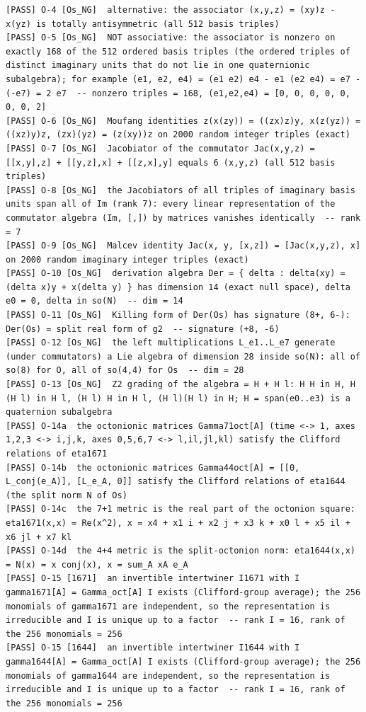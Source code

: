 \documentclass[
  10pt,
]{article}
\begin{document}
\begin{verbatim}
[PASS] O-4 [Os_NG]  alternative: the associator (x,y,z) = (xy)z - x(yz) is totally antisymmetric (all 512 basis triples)
[PASS] O-5 [Os_NG]  NOT associative: the associator is nonzero on exactly 168 of the 512 ordered basis triples (the ordered triples of distinct imaginary units that do not lie in one quaternionic subalgebra); for example (e1, e2, e4) = (e1 e2) e4 - e1 (e2 e4) = e7 - (-e7) = 2 e7  -- nonzero triples = 168, (e1,e2,e4) = [0, 0, 0, 0, 0, 0, 0, 2]
[PASS] O-6 [Os_NG]  Moufang identities z(x(zy)) = ((zx)z)y, x(z(yz)) = ((xz)y)z, (zx)(yz) = (z(xy))z on 2000 random integer triples (exact)
[PASS] O-7 [Os_NG]  Jacobiator of the commutator Jac(x,y,z) = [[x,y],z] + [[y,z],x] + [[z,x],y] equals 6 (x,y,z) (all 512 basis triples)
[PASS] O-8 [Os_NG]  the Jacobiators of all triples of imaginary basis units span all of Im (rank 7): every linear representation of the commutator algebra (Im, [,]) by matrices vanishes identically  -- rank = 7
[PASS] O-9 [Os_NG]  Malcev identity Jac(x, y, [x,z]) = [Jac(x,y,z), x] on 2000 random imaginary integer triples (exact)
[PASS] O-10 [Os_NG]  derivation algebra Der = { delta : delta(xy) = (delta x)y + x(delta y) } has dimension 14 (exact null space), delta e0 = 0, delta in so(N)  -- dim = 14
[PASS] O-11 [Os_NG]  Killing form of Der(Os) has signature (8+, 6-): Der(Os) = split real form of g2  -- signature (+8, -6)
[PASS] O-12 [Os_NG]  the left multiplications L_e1..L_e7 generate (under commutators) a Lie algebra of dimension 28 inside so(N): all of so(8) for O, all of so(4,4) for Os  -- dim = 28
[PASS] O-13 [Os_NG]  Z2 grading of the algebra = H + H l: H H in H, H (H l) in H l, (H l) H in H l, (H l)(H l) in H; H = span(e0..e3) is a quaternion subalgebra
[PASS] O-14a  the octonionic matrices Gamma71oct[A] (time <-> 1, axes 1,2,3 <-> i,j,k, axes 0,5,6,7 <-> l,il,jl,kl) satisfy the Clifford relations of eta1671
[PASS] O-14b  the octonionic matrices Gamma44oct[A] = [[0, L_conj(e_A)], [L_e_A, 0]] satisfy the Clifford relations of eta1644 (the split norm N of Os)
[PASS] O-14c  the 7+1 metric is the real part of the octonion square: eta1671(x,x) = Re(x^2), x = x4 + x1 i + x2 j + x3 k + x0 l + x5 il + x6 jl + x7 kl
[PASS] O-14d  the 4+4 metric is the split-octonion norm: eta1644(x,x) = N(x) = x conj(x), x = sum_A xA e_A
[PASS] O-15 [1671]  an invertible intertwiner I1671 with I gamma1671[A] = Gamma_oct[A] I exists (Clifford-group average); the 256 monomials of gamma1671 are independent, so the representation is irreducible and I is unique up to a factor  -- rank I = 16, rank of the 256 monomials = 256
[PASS] O-15 [1644]  an invertible intertwiner I1644 with I gamma1644[A] = Gamma_oct[A] I exists (Clifford-group average); the 256 monomials of gamma1644 are independent, so the representation is irreducible and I is unique up to a factor  -- rank I = 16, rank of the 256 monomials = 256
\end{verbatim}
\end{document}
